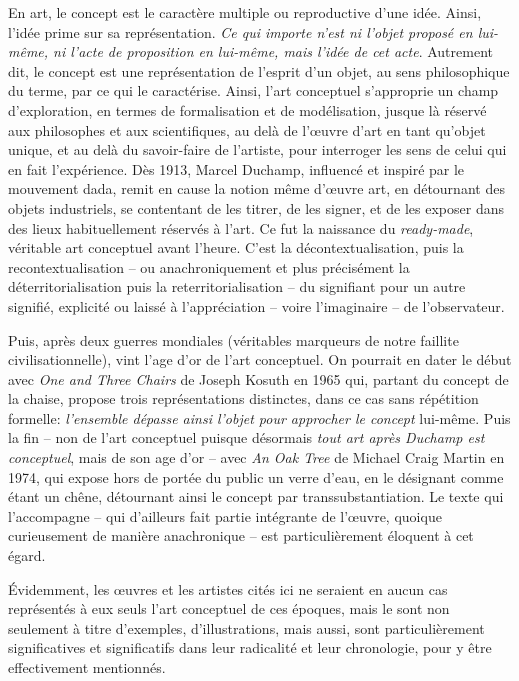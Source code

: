\documentclass{article}
\begin{document}
En art, le concept est le caractère multiple ou reproductive d'une idée. Ainsi, l'idée prime sur sa représentation. \textit{Ce qui importe n’est ni l’objet proposé en lui-même, ni l’acte de proposition en lui-même, mais l’idée de cet acte}. Autrement dit, le concept est une représentation de l’esprit d’un objet, au sens philosophique du terme, par ce qui le caractérise.
Ainsi, l'art conceptuel s'approprie un champ d'exploration, en termes de formalisation et de modélisation, jusque là réservé aux philosophes et aux scientifiques, au delà de l'œuvre d'art en tant qu'objet unique, et au delà du savoir-faire de l'artiste, pour interroger les sens de celui qui en fait l'expérience.
Dès 1913, Marcel Duchamp, influencé et inspiré par le mouvement dada, remit en cause la notion même d'œuvre art, en détournant des objets industriels, se contentant de les titrer, de les signer, et de les exposer dans des lieux habituellement réservés à l'art. Ce fut la naissance du \textit{ready-made}, véritable art conceptuel avant l'heure. C'est la décontextualisation, puis la recontextualisation -- ou anachroniquement et plus précisément la déterritorialisation puis la reterritorialisation -- du signifiant pour un autre signifié, explicité ou laissé à l'appréciation -- voire l'imaginaire -- de l'observateur. 

Puis, après deux guerres mondiales (véritables marqueurs de notre faillite civilisationnelle), vint l'age d'or de l'art conceptuel. On pourrait en dater le début avec \textit{One and Three Chairs} de Joseph Kosuth en 1965 qui, partant du concept de la chaise, propose trois représentations distinctes, dans ce cas sans répétition formelle: \textit{l’ensemble dépasse ainsi l’objet pour approcher le concept} lui-même. 
Puis la fin -- non de l'art conceptuel puisque désormais \textit{tout art après Duchamp est conceptuel}, mais de son age d'or -- avec \textit{An Oak Tree} de Michael Craig Martin en 1974, qui expose hors de portée du public un verre d'eau, en le désignant comme étant un chêne, détournant ainsi le concept par transsubstantiation. Le texte qui l'accompagne -- qui d'ailleurs fait partie intégrante de l'œuvre, quoique curieusement de manière anachronique -- est particulièrement éloquent à cet égard.  

Évidemment, les œuvres et les artistes cités ici ne seraient en aucun cas représentés à eux seuls l'art conceptuel de ces époques, mais le sont non seulement à titre d'exemples, d'illustrations, mais aussi, sont particulièrement significatives et significatifs dans leur radicalité et leur chronologie, pour y être effectivement mentionnés.
\end{document}
